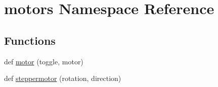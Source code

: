 \hypertarget{namespacemotors}{}\section{motors Namespace Reference}
\label{namespacemotors}
\subsection*{Functions}
\begin{DoxyCompactItemize}
\item 
def \hyperlink{namespacemotors_a8d42694388251619d786f041e64ba0a7}{motor} (toggle, motor)
\item 
def \hyperlink{namespacemotors_a62dbc374f173ca2aacd75eb672e4a1a1}{steppermotor} (rotation, direction)
\end{DoxyCompactItemize}
